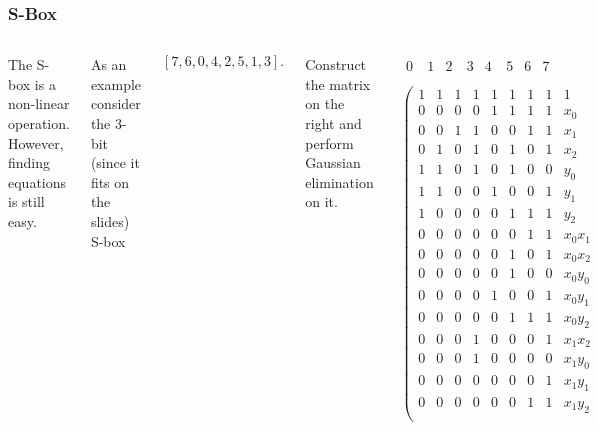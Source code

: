 \documentclass[9pt]{beamer}
\begin{document}
\begin{frame}
\frametitle{S-Box}
\begin{columns}


The S-box is a non-linear operation. However, finding equations is still easy.

\vspace{1em}

As an example consider the 3-bit (since it fits on the slides) S-box 

$$[7,6,0,4,2,5,1,3].$$

\vspace{1em}

Construct the matrix on the right and perform Gaussian elimination on it.

\begin{small}
\begin{align*}
\begin{array}{rrrrrrrrrr}
0\ & 1 & 2\  & 3 & 4\  & 5 & 6 & 7 & \ \ \ \ \ \ \ \ \ \ \\
\end{array}\\
\left(\begin{array}{rrrrrrrr|r}
1 & 1 & 1 & 1 & 1 & 1 & 1 & 1 & 1 \\
0 & 0 & 0 & 0 & 1 & 1 & 1 & 1 & x_{0} \\
0 & 0 & 1 & 1 & 0 & 0 & 1 & 1 & x_{1} \\
0 & 1 & 0 & 1 & 0 & 1 & 0 & 1 & x_{2} \\
1 & 1 & 0 & 1 & 0 & 1 & 0 & 0 & y_{0} \\
1 & 1 & 0 & 0 & 1 & 0 & 0 & 1 & y_{1} \\
1 & 0 & 0 & 0 & 0 & 1 & 1 & 1 & y_{2} \\
0 & 0 & 0 & 0 & 0 & 0 & 1 & 1 & x_{0} x_{1} \\
0 & 0 & 0 & 0 & 0 & 1 & 0 & 1 & x_{0} x_{2} \\
0 & 0 & 0 & 0 & 0 & 1 & 0 & 0 & x_{0} y_{0} \\
0 & 0 & 0 & 0 & 1 & 0 & 0 & 1 & x_{0} y_{1} \\
0 & 0 & 0 & 0 & 0 & 1 & 1 & 1 & x_{0} y_{2} \\
0 & 0 & 0 & 1 & 0 & 0 & 0 & 1 & x_{1} x_{2} \\
0 & 0 & 0 & 1 & 0 & 0 & 0 & 0 & x_{1} y_{0} \\
0 & 0 & 0 & 0 & 0 & 0 & 0 & 1 & x_{1} y_{1} \\
0 & 0 & 0 & 0 & 0 & 0 & 1 & 1 & x_{1} y_{2} \\

\end{array}
\end{align*}
\end{small}
\end{columns}
\end{frame}
\end{document}
